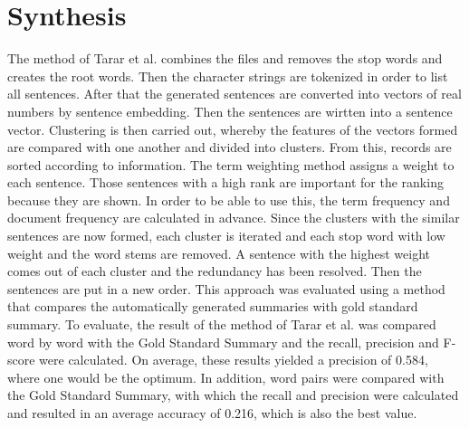\documentclass[a4paper,10pt, bibliography=totocnumbered]{scrreprt}
\begin{document}
\section{Synthesis}

The method of Tarar et al. \cite{tarar} combines the files and removes the stop words and creates the root words. Then the character strings are tokenized in order to list all sentences. After that the generated sentences are converted into vectors of real numbers by sentence embedding. Then the sentences are wirtten into a sentence vector. Clustering is then carried out, whereby the features of the vectors formed are compared with one another and divided into clusters. From this, records are sorted according to information. The term weighting method assigns a weight to each sentence. Those sentences with a high rank are important for the ranking because they are shown. In order to be able to use this, the term frequency and document frequency are calculated in advance. Since the clusters with the similar sentences are now formed, each cluster is iterated and each stop word with low weight and the word stems are removed. A sentence with the highest weight comes out of each cluster and the redundancy has been resolved. Then the sentences are put in a new order. This approach was evaluated using a method that compares the automatically generated summaries with gold standard summary.
To evaluate, the result of the method of Tarar et al. \cite{tarar} was compared word by word with the Gold Standard Summary and the recall, precision and F-score were calculated. On average, these results yielded a precision of 0.584, where one would be the optimum. In addition, word pairs were compared with the Gold Standard Summary, with which the recall and precision were calculated and resulted in an average accuracy of 0.216, which is also the best value. \linebreak
\end{document}
